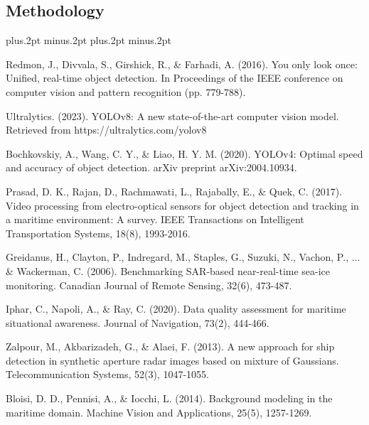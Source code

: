 \documentclass[twoside]{article}
\begin{document}
\begin{multicols}{2}
\section{Methodology}


\begin{thebibliography}{99}
\footnotesize
\itemsep=-3pt plus.2pt minus.2pt
\baselineskip=13pt plus.2pt minus.2pt

Redmon, J., Divvala, S., Girshick, R., \& Farhadi, A. (2016). You only look once: Unified, real-time object detection. In Proceedings of the IEEE conference on computer vision and pattern recognition (pp. 779-788).

Ultralytics. (2023). YOLOv8: A new state-of-the-art computer vision model. Retrieved from https://ultralytics.com/yolov8

Bochkovskiy, A., Wang, C. Y., \& Liao, H. Y. M. (2020). YOLOv4: Optimal speed and accuracy of object detection. arXiv preprint arXiv:2004.10934.

Prasad, D. K., Rajan, D., Rachmawati, L., Rajabally, E., \& Quek, C. (2017). Video processing from electro-optical sensors for object detection and tracking in a maritime environment: A survey. IEEE Transactions on Intelligent Transportation Systems, 18(8), 1993-2016.

Greidanus, H., Clayton, P., Indregard, M., Staples, G., Suzuki, N., Vachon, P., ... \& Wackerman, C. (2006). Benchmarking SAR-based near-real-time sea-ice monitoring. Canadian Journal of Remote Sensing, 32(6), 473-487.

Iphar, C., Napoli, A., \& Ray, C. (2020). Data quality assessment for maritime situational awareness. Journal of Navigation, 73(2), 444-466.

Zalpour, M., Akbarizadeh, G., \& Alaei, F. (2013). A new approach for ship detection in synthetic aperture radar images based on mixture of Gaussians. Telecommunication Systems, 52(3), 1047-1055.

Bloisi, D. D., Pennisi, A., \& Iocchi, L. (2014). Background modeling in the maritime domain. Machine Vision and Applications, 25(5), 1257-1269.


\end{thebibliography}
\end{multicols}
\end{document}
